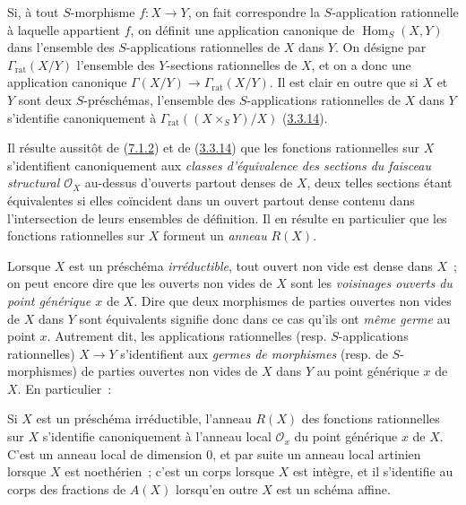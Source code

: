 Si, à tout $S$-morphisme $f:X\to Y$, on fait correspondre la $S$-application
rationnelle
à laquelle appartient $f$, on définit une application canonique de
$\operatorname{Hom}_S(X,Y)$ dans l'ensemble des $S$-applications rationnelles
de $X$ dans $Y$. On désigne par $\Gamma_{\mathrm{rat}}(X/Y)$ l'ensemble des
$Y$-sections rationnelles de $X$, et on a donc une application canonique
$\Gamma(X/Y)\to\Gamma_{\mathrm{rat}}(X/Y)$. Il est clair en outre que si $X$ et
$Y$ sont deux $S$-préschémas, l'ensemble des $S$-applications rationnelles de
$X$ dans $Y$ s'identifie canoniquement à
$\Gamma_{\mathrm{rat}}((X\times_S Y)/X)$
(\hyperref[I.3.3.14-fr]{3.3.14}).

\begin{env}[7.1.3]
\label{I.7.1.3-fr}
Il résulte aussitôt de (\hyperref[I.7.1.2-fr]{7.1.2}) et de
(\hyperref[I.3.3.14-fr]{3.3.14}) que les fonctions rationnelles sur $X$
s'identifient canoniquement aux
\emph{classes d'équivalence des sections du faisceau structural
$\mathscr{O}_X$} au-dessus d'ouverts partout denses de $X$, deux telles
sections étant équivalentes si elles coïncident dans un ouvert partout dense
contenu dans l'intersection de leurs ensembles de définition. Il en résulte en
particulier que les fonctions rationnelles sur $X$ forment un
\emph{anneau} $R(X)$.
\end{env}

\begin{env}[7.1.4]
\label{I.7.1.4-fr}
Lorsque $X$ est un préschéma \emph{irréductible}, tout ouvert non vide est dense
dans $X$~; on peut encore dire que les ouverts non vides de $X$ sont les
\emph{voisinages ouverts du point générique $x$} de $X$. Dire que deux
morphismes de parties ouvertes non vides de $X$ dans $Y$ sont équivalents
signifie donc dans ce cas qu'ils ont \emph{même germe} au point $x$. Autrement
dit, les applications rationnelles (resp. $S$-applications rationnelles)
$X\to Y$ s'identifient aux \emph{germes de morphismes} (resp. de
$S$-morphismes) de parties ouvertes non vides de $X$ dans $Y$ au point
générique $x$ de $X$. En particulier~:
\end{env}

\begin{proposition}[7.1.5]
\label{I.7.1.5-fr}
Si $X$ est un préschéma irréductible, l'anneau $R(X)$ des fonctions rationnelles
sur $X$ s'identifie canoniquement à l'anneau local $\mathscr{O}_x$ du point
générique $x$ de $X$. C'est un anneau local de dimension \textup{0}, et par suite un
anneau local artinien lorsque $X$ est noethérien~; c'est un corps lorsque $X$
est intègre, et il s'identifie au corps des fractions de $A(X)$ lorsqu'en outre
$X$ est un schéma affine.
\end{proposition}

